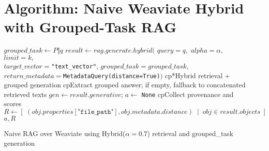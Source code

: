 \section{Algorithm: Naive Weaviate Hybrid with Grouped-Task RAG}\label{alg:naive-weaviate-hybrid}
\begin{algorithm}[H]
  \DontPrintSemicolon
  \BlankLine
  $grouped\_task \leftarrow P \Vert q$ 
  $result \leftarrow rag.generate.hybrid($
    $query{=}q,$ $alpha{=}\alpha,$ $limit{=}k,$\\
    $target\_vector{=}$\texttt{"text\_vector"}, $grouped\_task{=}grouped\_task,$\\
    $return\_metadata{=}$\texttt{MetadataQuery(distance=True)}$)$
  	cp*{Hybrid retrieval + grouped generation}
  \BlankLine
  	cp{Extract grouped answer; if empty, fallback to concatenated retrieved texts}
  $gen \leftarrow result.generative$; $a \leftarrow$ \texttt{None}\;
  \BlankLine
  	cp{Collect provenance and scores}
  $R \leftarrow [\; (obj.properties[\texttt{"file\_path"}], obj.metadata.distance) \;\mid\; obj \in result.objects\; ]$\;
  \BlankLine
  \Return $a, R$\;
  \caption{Naive RAG over Weaviate using Hybrid($\alpha{=}0.7$) retrieval and grouped\_task generation}
\end{algorithm}